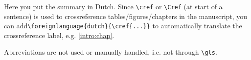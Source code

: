 %
%

Here you put the summary in Dutch. Since \verb=\cref= or \verb=\Cref= (at start of a sentence) is used to crossreference tables/figures/chapters in the manuscript, you can add\newline \verb=\foreignlanguage{dutch}{\cref{...}}= to automatically translate the crossreference label, e.g. \foreignlanguage{dutch}{\cref{intro:chap}}.

Abrreviations are not used or manually handled, i.e. not through \verb=\gls=.